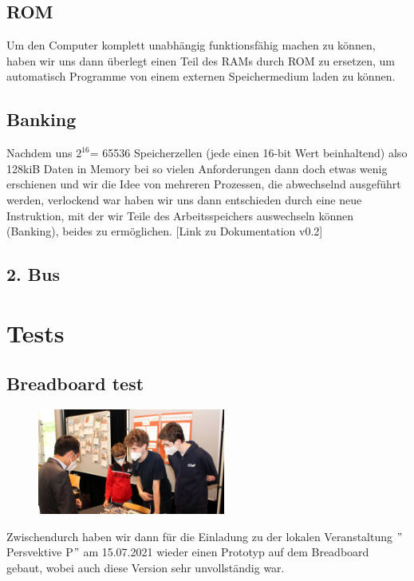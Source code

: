 \documentclass{scrartcl}
\begin{document}
    \subsection{ROM}
    Um den Computer komplett unabhängig funktionsfähig machen zu können, haben wir uns dann überlegt einen Teil des RAMs durch ROM zu ersetzen, um automatisch Programme von einem externen Speichermedium laden zu können.
    \subsection{Banking}
    Nachdem uns $2^{16}$= 65536 Speicherzellen (jede einen 16-bit Wert beinhaltend) also 128kiB Daten in Memory bei so vielen Anforderungen dann doch etwas wenig erschienen
    und wir die Idee von mehreren Prozessen, die abwechselnd ausgeführt werden, verlockend war haben wir uns dann entschieden durch eine neue Instruktion, mit der wir Teile des Arbeitsspeichers auswechseln können (Banking),
    beides zu ermöglichen. [Link zu Dokumentation v0.2]


    \subsection{2. Bus}


    \section{Tests}
    \subsection{Breadboard test}
        \begin{figure}
        \vspace{-40pt}
        \begin{center}
        \includegraphics[width=0.55\textwidth]{Perspektive_P}
        \end{center}
        \vspace{-50pt}
        \end{figure}
    Zwischendurch haben wir dann für die Einladung zu der lokalen Veranstaltung
    $"$Persvektive P$"$ am 15.07.2021 wieder einen Prototyp auf dem Breadboard gebaut, wobei auch diese Version sehr unvollständig war.
\end{document}
